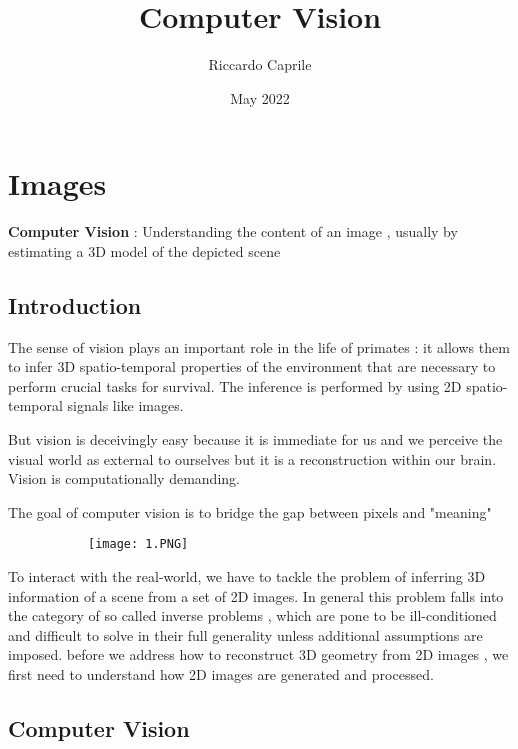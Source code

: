\documentclass{article}
\title{Computer Vision}
\author{Riccardo Caprile}
\date{May 2022}
\begin{document}
\maketitle

\section{Images}

\textbf{Computer Vision} : Understanding the content of an image , usually by estimating a 3D model of the depicted scene

\subsection{Introduction}

The sense of vision plays an important role in the life of primates : it allows them to infer 3D spatio-temporal properties of the environment that are necessary to perform crucial tasks for survival.
The inference is performed by using 2D spatio-temporal signals like images.

But vision is deceivingly easy because it is immediate for us and we perceive the visual world as external to ourselves but it is a reconstruction within our brain. Vision is computationally demanding.

The goal of computer vision is to bridge the gap between pixels and "meaning"

\begin{figure}[ht!]
  \centering
  \begin{subfigure}[b]{0.4\linewidth}
    \texttt{[image: 1.PNG]}
  \end{subfigure}
\end{figure}


To interact with the real-world, we have to tackle the problem of inferring 3D information of a scene from a set of 2D images.
In general this problem falls into the category of so called inverse problems , which are pone to be ill-conditioned and difficult to solve in their full generality unless additional assumptions are imposed. before we address how to reconstruct 3D geometry from 2D images , we first need to understand how 2D images are generated and processed.


\vspace{30mm}

\subsection{Computer Vision}
\end{document}

